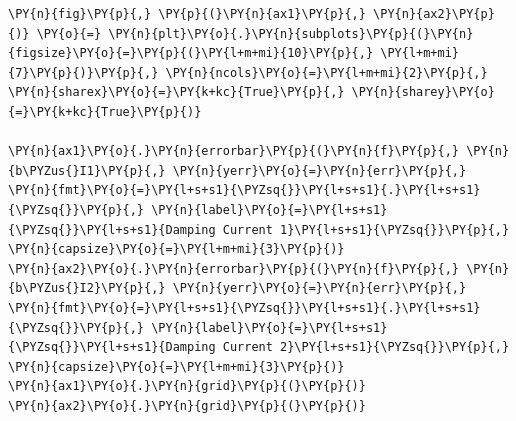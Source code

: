     \begin{tcolorbox}[breakable, size=fbox, boxrule=1pt, pad at break*=1mm,colback=cellbackground, colframe=cellborder]
\begin{Verbatim}[commandchars=\\\{\}]
\PY{n}{fig}\PY{p}{,} \PY{p}{(}\PY{n}{ax1}\PY{p}{,} \PY{n}{ax2}\PY{p}{)} \PY{o}{=} \PY{n}{plt}\PY{o}{.}\PY{n}{subplots}\PY{p}{(}\PY{n}{figsize}\PY{o}{=}\PY{p}{(}\PY{l+m+mi}{10}\PY{p}{,} \PY{l+m+mi}{7}\PY{p}{)}\PY{p}{,} \PY{n}{ncols}\PY{o}{=}\PY{l+m+mi}{2}\PY{p}{,} \PY{n}{sharex}\PY{o}{=}\PY{k+kc}{True}\PY{p}{,} \PY{n}{sharey}\PY{o}{=}\PY{k+kc}{True}\PY{p}{)}

\PY{n}{ax1}\PY{o}{.}\PY{n}{errorbar}\PY{p}{(}\PY{n}{f}\PY{p}{,} \PY{n}{b\PYZus{}I1}\PY{p}{,} \PY{n}{yerr}\PY{o}{=}\PY{n}{err}\PY{p}{,} \PY{n}{fmt}\PY{o}{=}\PY{l+s+s1}{\PYZsq{}}\PY{l+s+s1}{.}\PY{l+s+s1}{\PYZsq{}}\PY{p}{,} \PY{n}{label}\PY{o}{=}\PY{l+s+s1}{\PYZsq{}}\PY{l+s+s1}{Damping Current 1}\PY{l+s+s1}{\PYZsq{}}\PY{p}{,} \PY{n}{capsize}\PY{o}{=}\PY{l+m+mi}{3}\PY{p}{)}
\PY{n}{ax2}\PY{o}{.}\PY{n}{errorbar}\PY{p}{(}\PY{n}{f}\PY{p}{,} \PY{n}{b\PYZus{}I2}\PY{p}{,} \PY{n}{yerr}\PY{o}{=}\PY{n}{err}\PY{p}{,} \PY{n}{fmt}\PY{o}{=}\PY{l+s+s1}{\PYZsq{}}\PY{l+s+s1}{.}\PY{l+s+s1}{\PYZsq{}}\PY{p}{,} \PY{n}{label}\PY{o}{=}\PY{l+s+s1}{\PYZsq{}}\PY{l+s+s1}{Damping Current 2}\PY{l+s+s1}{\PYZsq{}}\PY{p}{,} \PY{n}{capsize}\PY{o}{=}\PY{l+m+mi}{3}\PY{p}{)}
\PY{n}{ax1}\PY{o}{.}\PY{n}{grid}\PY{p}{(}\PY{p}{)}
\PY{n}{ax2}\PY{o}{.}\PY{n}{grid}\PY{p}{(}\PY{p}{)}


\end{Verbatim}
\end{tcolorbox}
